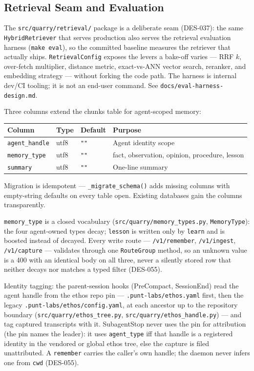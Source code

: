 \documentclass[a4paper,10pt]{article}
\newcommand{\modpath}[1]{\texttt{src/quarry/#1}}
\begin{document}
\subsection{Retrieval Seam and Evaluation}

The \modpath{retrieval/} package is a deliberate seam (DES-037): the same
\texttt{HybridRetriever} that serves production also serves the retrieval
evaluation harness (\texttt{make eval}), so the committed baseline
measures the retriever that actually ships.  \texttt{RetrievalConfig}
exposes the levers a bake-off varies --- RRF $k$, over-fetch multiplier,
distance metric, exact-vs-ANN vector search, reranker, and embedding
strategy --- without forking the code path.  The harness is internal
dev/CI tooling; it is not an end-user command.  See
\texttt{docs/eval-harness-design.md}.

Three columns extend the chunks table for agent-scoped memory:

\begin{center}
\begin{tabular}{llll}
\textbf{Column} & \textbf{Type} & \textbf{Default} & \textbf{Purpose} \\
\hline
\texttt{agent\_handle} & utf8 & \texttt{""} & Agent identity scope \\
\texttt{memory\_type} & utf8 & \texttt{""} & fact, observation, opinion, procedure, lesson \\
\texttt{summary} & utf8 & \texttt{""} & One-line summary \\
\end{tabular}
\end{center}

Migration is idempotent --- \texttt{\_migrate\_schema()} adds missing columns
with empty-string defaults on every table open. Existing databases gain
the columns transparently.

\texttt{memory\_type} is a closed vocabulary (\modpath{memory\_types.py},
\texttt{MemoryType}): the four agent-owned types decay; \texttt{lesson} is
written only by \texttt{learn} and is boosted instead of decayed.  Every
write route --- \texttt{/v1/remember}, \texttt{/v1/ingest},
\texttt{/v1/capture} --- validates through one \texttt{RouteGroup} method,
so an unknown value is a 400 with an identical body on all three, never a
silently stored row that neither decays nor matches a typed filter
(DES-055).

Identity tagging: the parent-session hooks (PreCompact, SessionEnd) read
the agent handle from the ethos repo pin --- \texttt{.punt-labs/ethos.yaml}
first, then the legacy \texttt{.punt-labs/ethos/config.yaml}, at each
ancestor up to the repository boundary (\modpath{ethos\_tree.py},
\modpath{ethos\_handle.py}) --- and tag captured transcripts with it.
SubagentStop never uses the pin for attribution (the pin names the
leader): it uses \texttt{agent\_type} iff that handle is a registered
identity in the vendored or global ethos tree, else the capture is filed
unattributed.  A \texttt{remember} carries the caller's own handle; the
daemon never infers one from \texttt{cwd} (DES-055).
\end{document}
